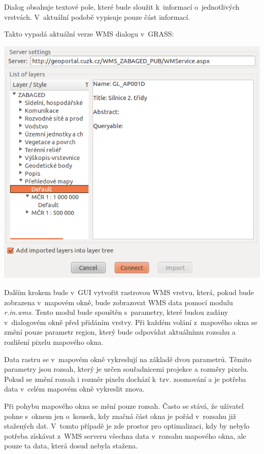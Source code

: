 \documentclass[a4paper,12pt]{article}
\begin{document}
Dialog obsahuje textové pole, které bude sloužit k~informací 
o~jednotlivých vrstvách. V~aktuální podobě vypisuje pouze část informací.

Takto vypadá aktuální verze WMS dialogu v~GRASS:
\begin{center}
\includegraphics[scale=0.5]{figures/GRASS_dialog_soucasny_stav.png}
\end{center}


 Dalším krokem bude v~GUI vytvořit rastrovou WMS vrstvu, která, pokud
 bude zobrazena v~mapovém okně, bude zobrazovat WMS data pomocí 
 modulu  \emph{r.in.wms}. Tento
 modul bude spouštěn s~parametry, které budou zadány v~dialogovém okně
 před přidáním vrstvy. Při každém volání z~mapového okna se změní
 pouze parametr region, který bude odpovídat aktuálnímu rozsahu a
 rozlišení pixelu mapového okna.
 
Data rastru se v~mapovém okně vykreslují na základě dvou parametrů. Těmito 
parametry jsou rozsah, který je určen souřadnicemi projekce a rozměry 
pixelu. Pokud se změní rozsah i rozměr pixelu dochází k~tzv. zoomování
a je potřeba data v~celém mapovém okně vykreslit znova. 
   
Při pohybu mapového okna se mění pouze rozsah. 
Často se stává, že uživatel pohne s~oknem jen o~kousek, kdy
značná část okna je pořád v~rozsahu již stažených dat. V~tomto případě
je zde prostor pro optimalizaci, kdy by nebylo potřeba  získávat
z~WMS serveru všechna data v~rozsahu mapového okna, ale pouze ta data,
která dosud nebyla stažena. 
\end{document}
